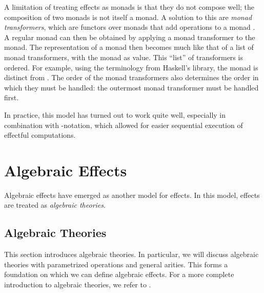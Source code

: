 A limitation of treating effects as monads is that they do not compose well; the composition of two monads is not itself a monad. A solution to this are \emph{monad transformers}, which are functors over monads that add operations to a monad \autocite{moggi_abstract_1989}. A regular monad can then be obtained by applying a monad transformer to the  monad. The representation of a monad then becomes much like that of a list of monad transformers, with the  monad as  value. This ``list'' of transformers is ordered. For example, using the terminology from Haskell's  library, the monad  is distinct from . The order of the monad transformers also determines the order in which they must be handled: the outermost monad transformer must be handled first.

In practice, this model has turned out to work quite well, especially in combination with -notation, which allowed for easier sequential execution of effectful computations.

\section{Algebraic Effects}\label{sec:alg}



Algebraic effects have emerged as another model for effects. In this model, effects are treated as \emph{algebraic theories}.

\subsection{Algebraic Theories}

This section introduces algebraic theories. In particular, we will discuss algebraic theories with parametrized operations and general arities. This forms a foundation on which we can define algebraic effects. For a more complete introduction to algebraic theories, we refer to \textcite{bauer_what_2018}.

